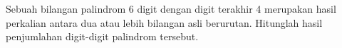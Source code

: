 Sebuah bilangan palindrom 6 digit dengan digit terakhir 4 merupakan hasil perkalian antara dua atau lebih bilangan asli berurutan. Hitunglah hasil penjumlahan digit-digit palindrom tersebut.